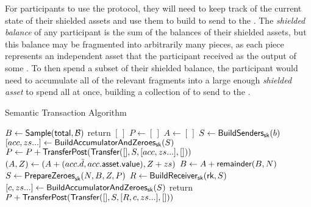 
For \MantaPay{} participants to use the \Transfer{} protocol, they will need to keep track of the current state of their shielded assets and use them to build  to send to the \Ledger{}. The \emph{shielded balance} of any participant is the sum of the balances of their shielded assets, but this balance may be fragmented into arbitrarily many pieces, as each piece represents an independent asset that the participant received as the output of some \Transfer{}. To then spend a subset of their shielded balance, the participant would need to accumulate all of the relevant fragments into a large enough \emph{shielded asset} to spend all at once, building a collection of  to send to the \Ledger{}.

\begin{algorithm*}
\caption{Semantic Transaction Algorithm}
\begin{algorithmic}
        \State $B \gets {\textsf{Sample}}({\textsf{total}}, \mathcal{B})$  
            \State \textsf{return} $[\,]$ 
        \EndIf
        \State $P \gets [\,]$ 
         
            \State $A \gets [\,]$
             
                \State $S \gets {\textsf{BuildSenders}}_{\textsf{sk}}(b)$
                \State $[acc, zs...] \gets {\textsf{BuildAccumulatorAndZeroes}}_{\textsf{sk}}(S)$ 
                \State $P \gets P + {\textsf{TransferPost}}({\textsf{Transfer}}([], S, [acc, zs...], []))$
                \State $(A, Z) \gets (A + (acc.\tilde{d}, acc.{\textsf{asset}}.{\textsf{value}}), Z + zs)$ 
            \EndFor
            \State $B \gets A + {\textsf{remainder}}(B, N)$
        \EndWhile
        \State $S \gets {\textsf{PrepareZeroes}}_{\textsf{sk}}(N, B, Z, P)$ 
        \State $R \gets {\textsf{BuildReceiver}}_{\textsf{sk}}({\textsf{rk}}, S)$
        \State $[c, zs...] \gets {\textsf{BuildAccumulatorAndZeroes}}_{\textsf{sk}}(S)$
        \State \textsf{return} $P + {\textsf{TransferPost}}({\textsf{Transfer}}([], S, [R, c, zs...], []))$
    \EndProcedure
\end{algorithmic}
\end{algorithm*}

